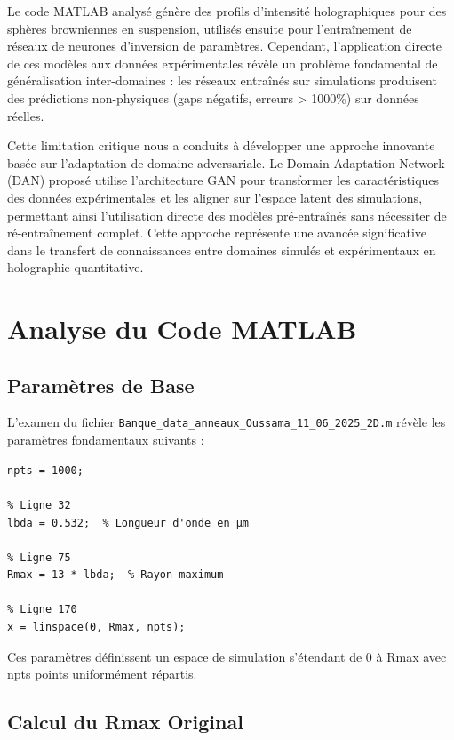 \documentclass[twocolumn,10pt]{article}
\begin{document}
Le code MATLAB analysé génère des profils d'intensité holographiques pour des sphères browniennes en suspension, utilisés ensuite pour l'entraînement de réseaux de neurones d'inversion de paramètres. Cependant, l'application directe de ces modèles aux données expérimentales révèle un problème fondamental de généralisation inter-domaines : les réseaux entraînés sur simulations produisent des prédictions non-physiques (gaps négatifs, erreurs > 1000\%) sur données réelles.

Cette limitation critique nous a conduits à développer une approche innovante basée sur l'adaptation de domaine adversariale. Le Domain Adaptation Network (DAN) proposé utilise l'architecture GAN pour transformer les caractéristiques des données expérimentales et les aligner sur l'espace latent des simulations, permettant ainsi l'utilisation directe des modèles pré-entraînés sans nécessiter de ré-entraînement complet. Cette approche représente une avancée significative dans le transfert de connaissances entre domaines simulés et expérimentaux en holographie quantitative.

\section{Analyse du Code MATLAB}

\subsection{Paramètres de Base}

L'examen du fichier \texttt{Banque\_data\_anneaux\_Oussama\_11\_06\_2025\_2D.m} révèle les paramètres fondamentaux suivants :

\begin{lstlisting}[style=matlab, caption=Paramètres de simulation extraits du code MATLAB]
% Ligne 29
npts = 1000;

% Ligne 32  
lbda = 0.532;  % Longueur d'onde en µm

% Ligne 75
Rmax = 13 * lbda;  % Rayon maximum

% Ligne 170
x = linspace(0, Rmax, npts);
\end{lstlisting}

Ces paramètres définissent un espace de simulation s'étendant de 0 à Rmax avec npts points uniformément répartis.

\subsection{Calcul du Rmax Original}
\end{document}
